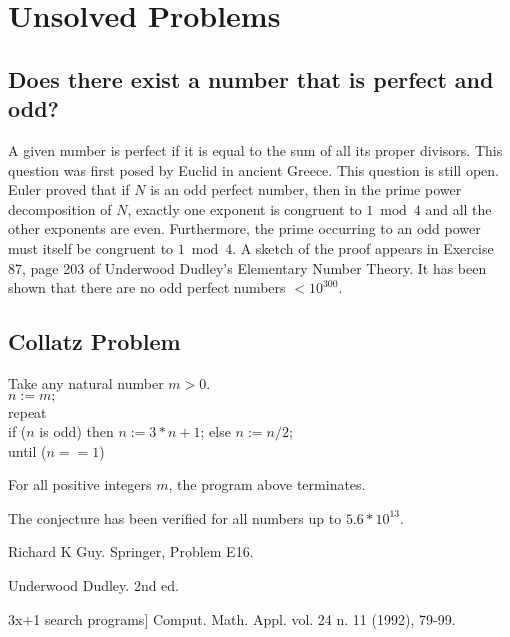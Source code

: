 \section{Unsolved Problems}

\subsection{Does there exist a number that is perfect and odd?}

A given number is perfect if it is equal to the sum of all its proper
divisors. This question was first posed by Euclid in ancient Greece.
This question is still open.  Euler proved that if $N$ is an odd perfect
number, then in the prime power decomposition of $N$, exactly one
exponent is congruent to $1 \bmod 4$ and all the other exponents are
even. Furthermore, the prime occurring to an odd power must itself be
congruent to $1 \bmod 4$.  A sketch of the proof appears in Exercise 87,
page 203 of Underwood Dudley's Elementary Number Theory.  It has been
shown that there are no odd perfect numbers $< 10^{300}$.

\subsection{Collatz Problem}


Take any natural number $m > 0$.\\
$n:=m;$\\
repeat\\
\hspace{1cm}  if ($n$ is odd) then $n:=3*n+1$; else $n:=n/2$;\\
until ($n==1$)\\

\begin{conj}
  For all positive integers $m$, the program above terminates.
\end{conj}

The conjecture has been verified for all numbers up to $5.6 * 10^{13}$.

\Ref

  {Richard K Guy.}  {Springer,
  Problem E16.}

  {Underwood Dudley.}  {2nd ed.}

 {3x+1 search programs}]
{Comput. Math. Appl.}  {vol. 24 n. 11 (1992), 79-99.}

%

